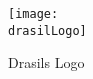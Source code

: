 \begin{figure}[H]
    \centering
    \caption{Drasils Logo}
    \label{fig:drasilLogo}
    \texttt{[image: \\drasilLogo]}
\end{figure}
